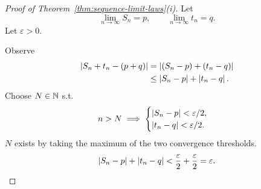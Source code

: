 \begin{proof}[Proof of Theorem~\ref{thm:sequence-limit-laws}(i)]
  Let
  \[
    \lim_{n\to\infty}S_n=p,\qquad\lim_{n\to\infty}t_n=q.
  \]
  Let $\varepsilon>0$.

  Observe
  \begin{align*}
    \left\lvert S_n+t_n-(p+q) \right\rvert
     & =\left\lvert (S_n-p)+(t_n-q) \right\rvert      \\
     & \le\left\lvert S_n-p \right\rvert+\left\lvert t_n-q \right\rvert.
  \end{align*}
  Choose $N\in\mathbb{N}$ s.t.
  \[
    n>N\implies
    \begin{cases}
      \left\lvert S_n-p \right\rvert<\varepsilon/2, \\
      \left\lvert t_n-q \right\rvert<\varepsilon/2.
    \end{cases}
  \]
  $N$ exists by taking the maximum of the two convergence thresholds.
  \[
    \left\lvert S_n-p \right\rvert+\left\lvert t_n-q \right\rvert<\frac\varepsilon2+\frac\varepsilon2
    =\varepsilon.\qedhere
  \]
\end{proof}

